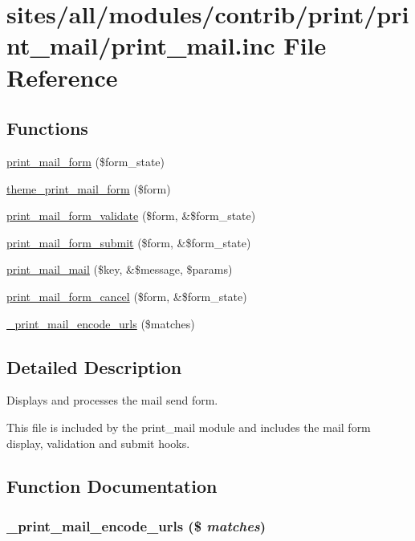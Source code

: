 \hypertarget{print__mail_8inc}{
\section{sites/all/modules/contrib/print/print\_\-mail/print\_\-mail.inc File Reference}
\label{print__mail_8inc}
}
\subsection*{Functions}
\begin{CompactItemize}
\item 
\hyperlink{group__forms_g4ed8b70bdf0ff196b847618f76378c06}{print\_\-mail\_\-form} (\$form\_\-state)
\item 
\hyperlink{group__forms_gdfd29c42f8222a01806b51c82db1a71b}{theme\_\-print\_\-mail\_\-form} (\$form)
\item 
\hyperlink{group__forms_ga2d6456473de55b23efba0e78f45a2ac}{print\_\-mail\_\-form\_\-validate} (\$form, \&\$form\_\-state)
\item 
\hyperlink{group__forms_g7246132b43dcb17338c06d0514cee450}{print\_\-mail\_\-form\_\-submit} (\$form, \&\$form\_\-state)
\item 
\hyperlink{print__mail_8inc_a175d4328038cbbf573c81559f103af4}{print\_\-mail\_\-mail} (\$key, \&\$message, \$params)
\item 
\hyperlink{group__forms_gf9d1d6734a5f84ab0272b1ff7d9f0344}{print\_\-mail\_\-form\_\-cancel} (\$form, \&\$form\_\-state)
\item 
\hyperlink{print__mail_8inc_2990b685bfe404255640f6326a0fcfed}{\_\-print\_\-mail\_\-encode\_\-urls} (\$matches)
\end{CompactItemize}


\subsection{Detailed Description}
Displays and processes the mail send form.

This file is included by the print\_\-mail module and includes the mail form display, validation and submit hooks. 

\subsection{Function Documentation}
\hypertarget{print__mail_8inc_2990b685bfe404255640f6326a0fcfed}{
\subsubsection[{\_\-print\_\-mail\_\-encode\_\-urls}]{\setlength{\rightskip}{0pt plus 5cm}\_\-print\_\-mail\_\-encode\_\-urls (\$ {\em matches})}}
\label{print__mail_8inc_2990b685bfe404255640f6326a0fcfed}


